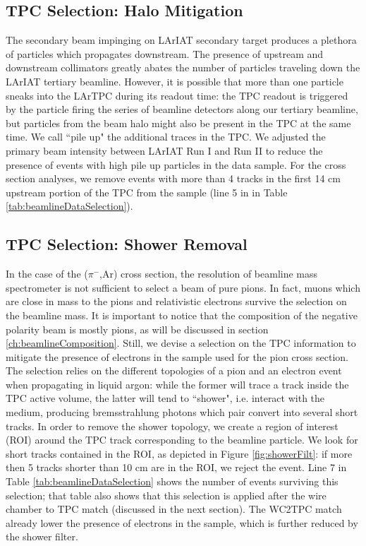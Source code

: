 \subsection{TPC Selection: Halo Mitigation }\label{ch:pileUp}
The secondary beam impinging on LArIAT secondary target produces a plethora of particles which propagates downstream. The presence of upstream and downstream collimators greatly abates the number of particles traveling down the LArIAT tertiary beamline. However, it is possible that more than one particle sneaks into the LArTPC during its readout time: the TPC readout is triggered by the particle  firing the series of beamline detectors along our tertiary beamline, but particles from the beam halo might also be present in the TPC at the same time. We call ``pile up" the additional traces in the TPC. We adjusted the primary beam intensity between LArIAT Run I and Run II to reduce the presence of events with high pile up particles in the data sample. For the cross section analyses, we remove events with more than 4 tracks in the first 14 cm upstream portion of the TPC from the sample (line 5 in in Table \ref{tab:beamlineDataSelection}).


\subsection{TPC Selection: Shower Removal}\label{ch:electrons}
In the case of the ($\pi^-$,Ar) cross section, the resolution of  beamline mass spectrometer is not sufficient to select a beam of pure pions. In fact,  muons which are close in mass to the pions and relativistic electrons survive the selection on the beamline mass.  It is important to notice that the composition of the negative polarity beam is mostly pions, as will be discussed in section \ref{ch:beamlineComposition}.
Still, we devise a selection on the TPC information to mitigate the presence of electrons in the sample used for the pion cross section. The selection relies on the different topologies of a pion and an electron event when propagating in liquid argon: while the former will trace a track inside the TPC active volume, the latter will tend to ``shower", i.e. interact with the medium, producing bremsstrahlung photons which pair convert into several short tracks. In order to remove the shower topology, we create a region of interest (ROI) around the TPC track corresponding to the beamline particle. We look for short tracks contained in the ROI, as depicted in Figure \ref{fig:showerFilt}:  if more then 5 tracks shorter than 10 cm are in the ROI, we reject the event. Line 7 in  Table \ref{tab:beamlineDataSelection} shows the number of events surviving this selection; that table also shows that this selection is applied after the wire chamber to TPC match (discussed in the next section). The WC2TPC match already lower the presence of electrons in the sample, which is further reduced by the shower filter.

